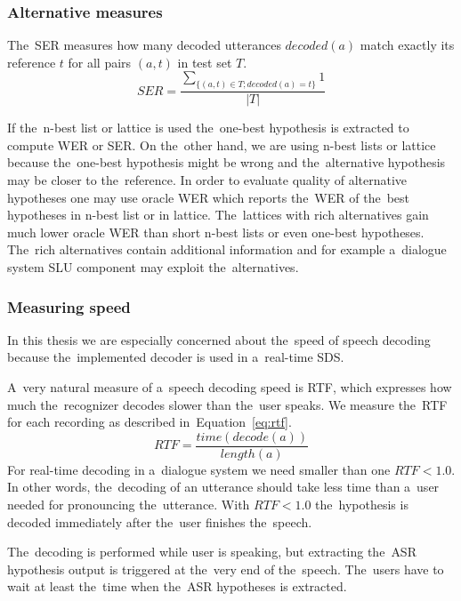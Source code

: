\subsubsection*{Alternative measures}
The~\acl{SER} measures how many decoded utterances $decoded(a)$ match exactly its reference $t$ for all pairs $(a, t)$ in test set $T$.
\begin{equation}
    SER = \frac{\sum_{\{(a, t) \in T; decoded(a) = t\}}{1}}{|T|}
\end{equation}

If the~n-best list or lattice is used the~one-best hypothesis is extracted to compute \ac{WER} or \ac{SER}.
On the~other hand, we are using n-best lists or lattice because the~one-best hypothesis might be wrong and the~alternative hypothesis may be closer to the~reference.
In order to evaluate quality of alternative hypotheses one may use oracle \ac{WER} which reports the~WER of the~best hypotheses in n-best list or in lattice.
The~lattices with rich alternatives gain much lower oracle \ac{WER} than short n-best lists or even one-best hypotheses.
The~rich alternatives contain additional information and for example a~dialogue system \acl{SLU} component may exploit the~alternatives.

\subsubsection*{Measuring speed}
In this thesis we are especially concerned about the~speed of speech decoding because the~implemented decoder is used in a~real-time \acl{SDS}.

A~very natural measure of a~speech decoding speed is \acl{RTF}, which expresses how much the~recognizer decodes slower than the~user speaks.
We measure the~\ac{RTF} for each recording as described in~Equation~\ref{eq:rtf}.
\begin{equation}\label{eq:rtf}
    RTF = \frac{time(decode(a))}{length(a)}
\end{equation}
For real-time decoding in a~dialogue system we need smaller than one $RTF < 1.0$.
In other words, the~decoding of an utterance should take less time than a~user needed for pronouncing the~utterance.
With $RTF < 1.0$ the~hypothesis is decoded immediately after the~user finishes the~speech. 

The~decoding is performed while user is speaking, but extracting the~\ac{ASR} hypothesis output is triggered at the~very end of the~speech.
The~users have to wait at least the~time when the~\ac{ASR} hypotheses is extracted.

